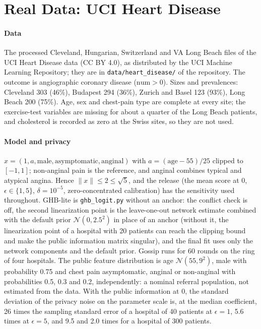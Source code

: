 \documentclass[acmsmall,screen,nonacm]{acmart}
\theoremstyle{acmdefinition}
\begin{document}
\section{Real Data: UCI Heart Disease}\label{sec:real}

\paragraph{Data} The processed Cleveland, Hungarian, Switzerland and VA Long Beach files of the UCI Heart Disease data \cite{detrano1989international} (CC BY 4.0), as distributed by the UCI Machine Learning Repository; they are in \texttt{data/heart\_disease/} of the repository. The outcome is angiographic coronary disease ($\text{num}>0$). Sizes and prevalences: Cleveland 303 (46\%), Budapest 294 (36\%), Zurich and Basel 123 (93\%), Long Beach 200 (75\%). Age, sex and chest-pain type are complete at every site; the exercise-test variables are missing for about a quarter of the Long Beach patients, and cholesterol is recorded as zero at the Swiss sites, so they are not used.

\paragraph{Model and privacy} $x=(1,a,\text{male},\text{asymptomatic},\text{anginal})$ with $a=(\text{age}-55)/25$ clipped to $[-1,1]$; non-anginal pain is the reference, and anginal combines typical and atypical angina. Hence $\|x\|\le 2\le\sqrt{5}$, and the release (the mean score at 0, $\epsilon\in\{1,5\}$, $\delta=10^{-5}$, zero-concentrated calibration) has the sensitivity used throughout. GHB-lite is \texttt{ghb\_logit.py} without an anchor: the conflict check is off, the second linearization point is the leave-one-out network estimate combined with the default prior $\mathcal{N}(0,2.5^2)$ in place of an anchor (without it, the linearization point of a hospital with 20 patients can reach the clipping bound and make the public information matrix singular), and the final fit uses only the network components and the default prior. Gossip runs for 60 rounds on the ring of four hospitals. The public feature distribution is age $\mathcal{N}(55,9^2)$, male with probability 0.75 and chest pain asymptomatic, anginal or non-anginal with probabilities 0.5, 0.3 and 0.2, independently: a nominal referral population, not estimated from the data. With the public information at 0, the standard deviation of the privacy noise on the parameter scale is, at the median coefficient, 26 times the sampling standard error of a hospital of 40 patients at $\epsilon=1$, 5.6 times at $\epsilon=5$, and 9.5 and 2.0 times for a hospital of 300 patients.
\end{document}
